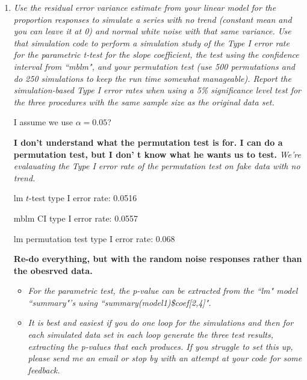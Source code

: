\documentclass[11pt]{article}
\begin{document}
\begin{enumerate}
However, I would question the validity of the confidence level set using {\texttt confint()} on an {\texttt mblm()} object. If there was strong evidence of an effect of temperature, at the 95\% confidence level, we would expect to ``reject" 5\% of the time, meaning that approximately 5\% of confidence intervals, in the long run, should contain 0.


\item%
{\it Use the residual error variance estimate from your linear model for the proportion responses to simulate a series with no trend (constant mean and you can leave it at 0) and normal white noise with that same variance. Use that simulation code to perform a simulation study of the Type I error rate for the parametric t-test for the slope coefficient, the test using the confidence interval from ``mblm", and your permutation test (use 500 permutations and do 250 simulations to keep the run time somewhat manageable). Report the simulation-based Type I error rates when using a 5\% significance level test for the three procedures with the same sample size as the original data set.}

I assume we use $\alpha=0.05$?

{\bf I don't understand what the permutation test is for. I can do a permutation test, but I don' t know what he wants us to test.} \emph{We're evalauating the Type I error rate of the permutation test on fake data with no trend.}



lm $t$-test type I error rate: 0.0516

mblm CI type I error rate: 0.0557

lm permutation test type I error rate: 0.068

{\bf Re-do everything, but with the random noise responses rather than the obesrved data.}

\begin{itemize}
\item%
{\it For the parametric test, the p-value can be extracted from the ``lm"  model ``summary"'s using ``summary(model1)\$coef[2,4]".}



\item%
{\it It is best and easiest if you do one loop for the simulations and then for each simulated data set in each loop generate the three test results, extracting the p-values that each produces. If you struggle to set this up, please send me an email or stop by with an attempt at your code for some feedback.}


\end{itemize}
\end{enumerate}
\end{document}
